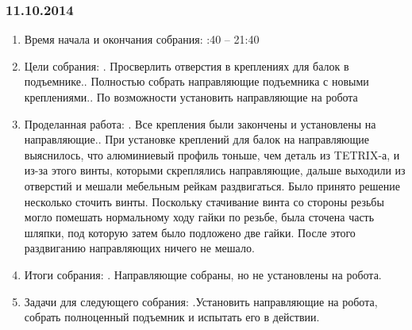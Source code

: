\documentclass[11pt]{article}
\begin{document}
         \subsubsection{11.10.2014}
         \begin{enumerate}
            \item Время начала и окончания собрания:
            :40 – 21:40
            \item Цели собрания:
            .   Просверлить отверстия в креплениях для балок в подъемнике..   Полностью собрать направляющие подъемника с новыми креплениями..   По возможности установить направляющие на робота
            \newline
            \item Проделанная работа:
            . Все крепления были закончены и установлены на направляющие..   При установке креплений для балок на направляющие выяснилось, что алюминиевый профиль тоньше, чем деталь из TETRIX-а, и из-за этого винты, которыми скреплялись направляющие, дальше выходили из отверстий и мешали мебельным рейкам раздвигаться. Было принято решение несколько сточить винты. Поскольку стачивание винта со стороны резьбы могло помешать нормальному ходу гайки по резьбе, была сточена часть шляпки, под которую затем было подложено две гайки. После этого раздвиганию направляющих ничего не мешало.
            \item Итоги собрания:
            .   Направляющие собраны, но не установлены на робота.
            \item Задачи для следующего собрания:
            .Установить направляющие на робота, собрать полноценный подъемник и испытать его в действии.
         \end{enumerate}
         \newpage
\end{document}
